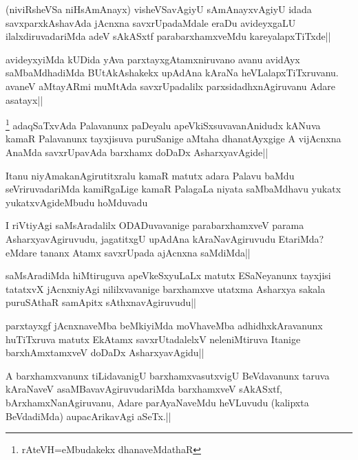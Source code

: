 \begin{artha}%
(niviRsheVSa niHsAmAnayx) visheVSavAgiyU sAmAnayxvAgiyU idada savxparxkAshavAda jAcnxna savxrUpadaMdale eraDu avideyxgaLU ilalxdiruvadariMda adeV sAkASxtf parabarxhamxveMdu kareyalapxTiTxde||
\end{artha}

\begin{artha}
avideyxyiMda kUDida yAva parxtayxgAtamxniruvano avanu avidAyx saMbaMdhadiMda BUtAkAshakekx upAdAna kAraNa heVLalapxTiTxruvanu. avaneV aMtayARmi muMtAda savxrUpadalilx parxsidadhxnAgiruvanu Adare asatayx||
\end{artha}

\begin{artha}
\footnote[1]{rAteVH=eMbudakekx dhanaveMdathaR} adaqSaTxvAda Palavanunx paDeyalu apeVkiSxsuvavanAnidudx kANuva kamaR Palavanunx tayxjisuva puruSanige aMtaha dhanatAyxgige A vijAcnxna AnaMda savxrUpavAda barxhamx doDaDx AsharxyavAgide||
\end{artha}

\begin{artha}
Itanu niyAmakanAgirutitxralu kamaR matutx adara Palavu baMdu seVriruvadariMda kamiRgaLige kamaR PalagaLa niyata saMbaMdhavu yukatx yukatxvAgideMbudu hoMduvadu
\end{artha}

\begin{artha}%
I riVtiyAgi saMsAradalilx ODADuvavanige parabarxhamxveV parama AsharxyavAgiruvudu, jagatitxgU upAdAna kAraNavAgiruvudu EtariMda? eMdare tananx Atamx savxrUpada ajAcnxna saMdiMda||
\end{artha}

\begin{artha}
saMsAradiMda hiMtiruguva apeVkeSxyuLaLx matutx ESaNeyanunx tayxjisi tatatxvX jAcnxniyAgi nililxvavanige barxhamxve utatxma Asharxya sakala puruSAthaR samApitx sAthxnavAgiruvudu||
\end{artha}

\begin{artha}
parxtayxgf jAcnxnaveMba beMkiyiMda moVhaveMba adhidhxkAravanunx huTiTxruva matutx EkAtamx savxrUtadalelxV neleniMtiruva Itanige barxhAmxtamxveV doDaDx AsharxyavAgidu||
\end{artha}

\begin{artha}
A barxhamxvanunx tiLidavanigU barxhamxvasutxvigU BeVdavanunx taruva kAraNaveV asaMBavavAgiruvudariMda barxhamxveV sAkASxtf, bArxhamxNanAgiruvanu, Adare parAyaNaveMdu heVLuvudu (kalipxta BeVdadiMda) aupacArikavAgi aSeTx.||
\end{artha}

\begin{artha}%

\end{artha}
